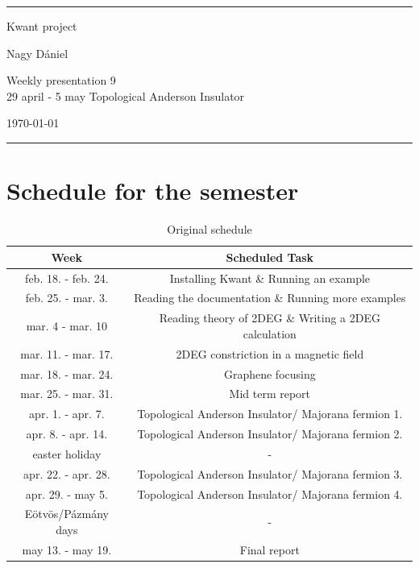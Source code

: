 \documentclass[12pt]{article}
\numberwithin{equation}{section}
\begin{document}
\begin{center}

\thispagestyle{empty}

\rule{10 cm}{2pt}

\vspace{1.5cm}
{ \Large Kwant project}

\vspace{1.0cm}
Nagy Dániel

\vspace{0.5cm}
Weekly presentation 9 \\
29 april - 5 may
Topological Anderson Insulator

\vspace{0.5cm}
\today

\vspace{0.25cm}
\rule{10 cm}{2pt}

\end{center}
\newpage

\newpage
{}

\section{Schedule for the semester}
\begin{table}[ht]
  \centering
  \caption{Original schedule}
  \begin{tabular}{|c|c|}
  \hline
  Week & Scheduled Task \\ [0.5ex]  \hline %
  feb. 18. - feb. 24. & Installing Kwant \& Running an example \\ \hline
  feb. 25. - mar. 3. & Reading the documentation \& Running more examples \\ \hline
  mar. 4 - mar. 10 & Reading theory of 2DEG \& Writing a 2DEG calculation \\ \hline 
  mar. 11. - mar. 17. & 2DEG constriction in a magnetic field \\ \hline
  mar. 18. -  mar. 24. & Graphene focusing \\ \hline
  mar. 25. -  mar. 31. & Mid term report \\ \hline
  apr. 1. -  apr. 7. & Topological Anderson Insulator/ Majorana fermion 1. \\ \hline
  apr. 8. -  apr. 14. & Topological Anderson Insulator/ Majorana fermion 2. \\ \hline
  easter holiday & - \\ \hline
  apr. 22. - apr. 28. & Topological Anderson Insulator/ Majorana fermion 3. \\ \hline 
  apr. 29. - may 5. & Topological Anderson Insulator/ Majorana fermion 4. \\ \hline 
  Eötvös/Pázmány days & - \\ \hline
  may 13. - may 19. & Final report \\ \hline

  \end{tabular}
\end{table}
\end{document}

